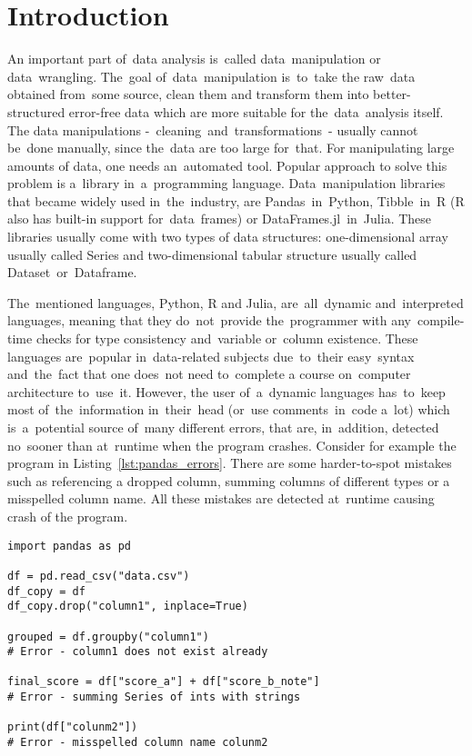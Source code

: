 \chapter*{Introduction}

An important part of~data analysis is~called data~manipulation or data~wrangling.
The~goal of~data~manipulation is~to~take the raw~data obtained from~some source, clean them and transform them into
better-structured error-free data which are more suitable for the~data~analysis itself.
The data manipulations -~cleaning~and~transformations~- usually cannot be~done manually, since the~data are too large
for~that.
For manipulating large amounts of data, one needs an~automated tool.
Popular approach to solve this problem is a~library in~a~programming language.
Data~manipulation libraries that became widely used in~the~industry, are Pandas~in~Python\cite{pandas_docs},
Tibble~in~R\cite{tibble} (R also has built-in
support for~data~frames\cite{R-base}) or DataFrames.jl~in~Julia\cite{DataFrames.jl}.
These libraries usually come with two types of data structures: one-dimensional array usually called Series
and two-dimensional tabular structure usually called Dataset~or~Dataframe.

The~mentioned languages, Python, R and Julia, are~all~dynamic and~interpreted languages, meaning that they do~not~provide
the~programmer with any~compile-time checks for type consistency and~variable or~column existence.
These languages are~popular in~data-related subjects due~to~their easy~syntax and~the~fact that
one does~not need to~complete a course on~computer architecture to~use~it.
However, the user of~a~dynamic languages has~to~keep most of~the~information in~their~head (or~use comments~in~code a~lot)
which is~a~potential source of~many different errors, that are, in~addition, detected no~sooner than at~runtime when
the program crashes.
Consider for example the program in Listing~\ref{lst:pandas_errors}.
There are some harder-to-spot mistakes such as referencing a dropped column, summing columns of different types
or a misspelled column name.
All these mistakes are detected at~runtime causing crash of the program.

\begin{lstlisting}[caption=Pandas code with errors, label={lst:pandas_errors}, captionpos=b]
import pandas as pd

df = pd.read_csv("data.csv")
df_copy = df
df_copy.drop("column1", inplace=True)

grouped = df.groupby("column1")
# Error - column1 does not exist already

final_score = df["score_a"] + df["score_b_note"]
# Error - summing Series of ints with strings

print(df["colunm2"])
# Error - misspelled column name colunm2

\end{lstlisting}

